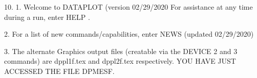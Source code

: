 10.
1. Welcome to DATAPLOT (version 02/29/2020  For assistance at
   any time during a run, enter HELP   .

2. For a list of new commands/capabilities,
   enter NEWS  (updated 02/29/2020)

3. The alternate Graphics output files (creatable
   via the DEVICE 2 and 3 commands) are
   dppl1f.tex and dppl2f.tex respectively.
YOU HAVE JUST ACCESSED THE FILE DPMESF.
